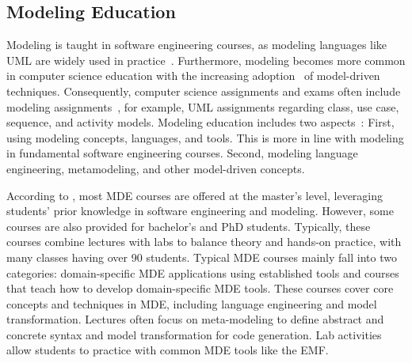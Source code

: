 \subsection{Modeling Education}
Modeling is taught in software engineering courses, as modeling languages like \ac{UML} are widely used in practice~\cite{Engels2006, Stahl2006}.
Furthermore, modeling becomes more common in computer science education with the increasing adoption~\cite{Brambilla2017, Hutchinson2011} of model-driven techniques.
Consequently, computer science assignments and exams often include modeling assignments~\cite{Ciccozzi2018, Stahl2006, Saglam2023}, for example, \ac{UML} assignments regarding class, use case, sequence, and activity models.
%
Modeling education includes two aspects~\cite{Kienzle2024}: First, using modeling concepts, languages, and tools. This is more in line with modeling in fundamental software engineering courses. Second, modeling language engineering, metamodeling, and other model-driven concepts.

According to \cite{Ciccozzi2018}, most \ac{MDE} courses are offered at the master's level, leveraging students' prior knowledge in software engineering and modeling. However, some courses are also provided for bachelor's and PhD students. Typically, these courses combine lectures with labs to balance theory and hands-on practice, with many classes having over 90 students.
%
Typical \ac{MDE} courses mainly fall into two categories: domain-specific \ac{MDE} applications using established tools and courses that teach how to develop domain-specific \ac{MDE} tools. These courses cover core concepts and techniques in \ac{MDE}, including language engineering and model transformation. Lectures often focus on meta-modeling to define abstract and concrete syntax and model transformation for code generation. Lab activities allow students to practice with common \ac{MDE} tools like the \ac{EMF}.

